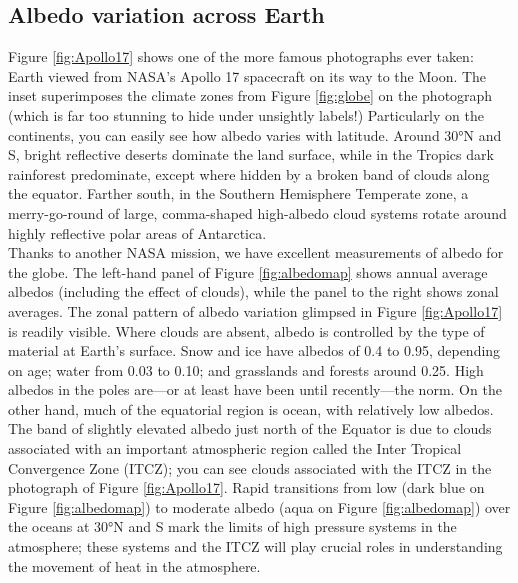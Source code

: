 \documentclass[amstex,12pt]{book}
\begin{document}
\subsection{Albedo variation across Earth}
Figure \ref{fig:Apollo17} shows one of the more famous photographs ever taken: Earth viewed from NASA's Apollo 17 spacecraft on its way to the Moon. The inset superimposes the climate zones from Figure \ref{fig:globe} on the photograph (which is far too stunning to hide under unsightly labels!) Particularly on the continents, you can easily see how albedo varies with latitude. Around $\ang{30}$N and S, bright reflective deserts dominate the land surface, while in the Tropics dark rainforest predominate, except where hidden by a broken band of clouds along the equator. Farther south, in the Southern Hemisphere Temperate zone, a merry-go-round of large, comma-shaped high-albedo cloud systems rotate around highly reflective polar areas of Antarctica.\\
Thanks to another NASA mission, we have excellent measurements of albedo for the globe. The left-hand panel of Figure \ref{fig:albedomap} shows annual average albedos (including the effect of clouds), while the panel to the right shows zonal averages. The zonal pattern of albedo variation glimpsed in Figure \ref{fig:Apollo17} is readily visible. Where clouds are absent, albedo is controlled by the type of material at Earth's surface. Snow and ice have albedos of 0.4 to 0.95, depending on age; water from 0.03 to 0.10; and grasslands and forests around 0.25. High albedos in the poles are---or at least have been until recently---the norm. On the other hand, much of the equatorial region is ocean, with relatively low albedos. The band of slightly elevated albedo just north of the Equator is due to clouds associated with an important atmospheric region called the Inter Tropical Convergence Zone (ITCZ); you can see clouds associated with the ITCZ in the photograph of Figure \ref{fig:Apollo17}. Rapid transitions from low (dark blue on Figure \ref{fig:albedomap}) to moderate albedo (aqua on Figure \ref{fig:albedomap}) over the oceans at $\ang{30}$N and S mark the limits of high pressure systems in the atmosphere; these systems and the ITCZ will play crucial roles in understanding the movement of heat in the atmosphere.
\end{document}
